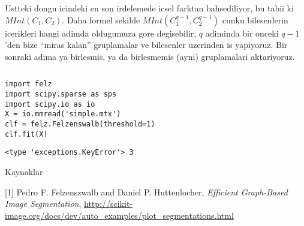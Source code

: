 \documentclass[12pt,fleqn]{article}\usepackage{../common}
\begin{document}
Ustteki dongu icindeki en son irdelemede icsel farktan bahsediliyor, bu
tabii ki $MInt(C_1,C_2)$. Daha formel sekilde $MInt(C_1^{q-1},C_2^{q-1})$
cunku bilesenlerin icerikleri hangi adimda oldugumuza gore degisebilir, $q$
adiminda bir onceki $q-1$'den bize ``miras kalan'' gruplamalar ve
bilesenler uzerinden is yapiyoruz. Bir sonraki adima ya birlesmis, ya da
birlesmemis (ayni) gruplamalari aktariyoruz. 

\inputminted[fontsize=\footnotesize]{python}{felz.py}

\begin{verbatim}
import felz
import scipy.sparse as sps
import scipy.io as io
X = io.mmread('simple.mtx')
clf = felz.Felzenswalb(threshold=1)
clf.fit(X)
\end{verbatim}

\begin{verbatim}
<type 'exceptions.KeyError'> 3
\end{verbatim}









Kaynaklar

[1] Pedro F. Felzenszwalb and Daniel P. Huttenlocher, {\em Efficient
  Graph-Based Image Segmentation},
\url{http://scikit-image.org/docs/dev/auto_examples/plot_segmentations.html}
\end{document}
